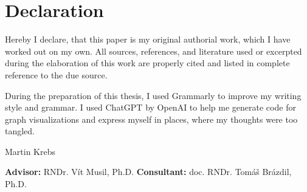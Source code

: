 \chapter*{Declaration}

\noindent
Hereby I declare, that this paper is my original authorial work, which I have worked out on my own.
All sources, references, and literature used or excerpted during the elaboration of this work are properly cited and listed in complete reference to the due source.

During the preparation of this thesis, I used Grammarly to improve my writing style and grammar.
I used ChatGPT by OpenAI to help me generate code for graph visualizations and express myself in places, where my thoughts were too tangled.

\vspace{1cm}
\begin{flushright}
    Martin Krebs
\end{flushright}
\vfill
\textbf{Advisor:} RNDr. Vít Musil, Ph.D.
\newline
\textbf{Consultant:} doc. RNDr. Tomáš Brázdil, Ph.D.
